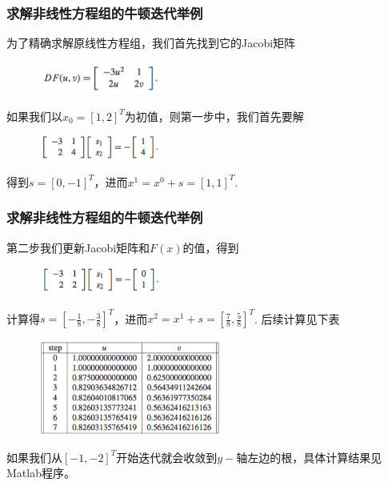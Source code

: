 \documentclass[10pt]{beamer}
\begin{document}
\begin{frame}
\frametitle{求解非线性方程组的牛顿迭代举例}
为了精确求解原线性方程组，我们首先找到它的Jacobi矩阵
\begin{figure}
\includegraphics[width=4cm]{figs/2_6_Nonlinear-Examp-1-2} 
\end{figure}
如果我们以$x_0 = [1,2]^T$为初值，则第一步中，我们首先要解
\begin{figure}
\includegraphics[width=4cm]{figs/2_6_Nonlinear-Examp-1-3} 
\end{figure}
得到$s = [0,-1]^T$，进而$x^{1} = x^0 + s = [1,1]^T$.
\end{frame}


\begin{frame}
\frametitle{求解非线性方程组的牛顿迭代举例}
第二步我们更新Jacobi矩阵和$F(x)$的值，得到
\begin{figure}
\includegraphics[width=4cm]{figs/2_6_Nonlinear-Examp-1-4} 
\end{figure}
计算得$s = [-\frac{1}{8},-\frac{3}{8}]^T$，进而$x^{2} = x^1 + s = [\frac{7}{8},\frac{5}{8}]^T$.
后续计算见下表
\begin{figure}
\includegraphics[width=6cm]{figs/2_6_Nonlinear-Examp-1-5} 
\end{figure}
如果我们从$[-1,-2]^T$开始迭代就会收敛到$y-$轴左边的根，具体计算结果见Matlab程序。
\end{frame}
\end{document}
